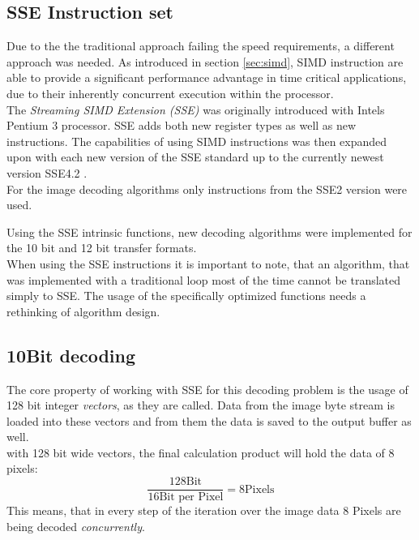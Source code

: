 \subsection{SSE Instruction set}

Due to the the traditional approach failing the speed requirements, a different approach was needed. As introduced in section \ref{sec:simd}, SIMD instruction are able to provide a significant performance advantage in time critical applications, due to their inherently concurrent execution within the processor.\\
The \textit{Streaming SIMD Extension (SSE)} was originally introduced with Intels Pentium 3 processor. SSE adds both new register types as well as new instructions. The capabilities of using SIMD instructions was then expanded upon with each new version of the SSE standard up to the currently newest version SSE4.2 \cite{ModernAssembly}.\\
For the image decoding algorithms only instructions from the SSE2 version were used.\par

Using the SSE intrinsic functions, new decoding algorithms were implemented for the 10 bit and 12 bit transfer formats.\\
When using the SSE instructions it is important to note, that an algorithm, that was implemented with a traditional loop most of the time cannot be translated simply to SSE. The usage of the specifically optimized functions needs a rethinking of algorithm design.

\subsection{10Bit decoding}

The core property of working with SSE for this decoding problem is the usage of 128 bit integer \textit{vectors}, as they are called. Data from the image byte stream is loaded into these vectors and from them the data is saved to the output buffer as well.\\
with 128 bit wide vectors, the final calculation product will hold the data of 8 pixels:
\[
\frac{128\text{Bit}}{16 \text{Bit per Pixel}} = 8 \text{Pixels}
\]
This means, that in every step of the iteration over the image data 8 Pixels are being decoded \textit{concurrently}.\par 

